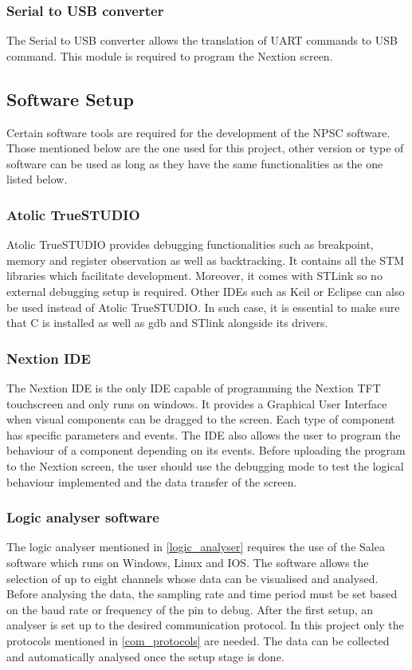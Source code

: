 \subsubsection{Serial to USB converter}
The Serial to USB converter allows the translation of UART commands to USB command. This module is required to program the Nextion screen.
 
\subsection{Software Setup}\label{software_setup}
Certain software tools are required for the development of the NPSC software. Those mentioned below are the one used for this project, other version or type of software can be used as long as they have the same functionalities as the one listed below.
\subsubsection{Atolic TrueSTUDIO}
Atolic TrueSTUDIO provides debugging functionalities such as breakpoint, memory and register observation as well as backtracking. It contains all the STM libraries which facilitate development. Moreover, it comes with STLink so no external debugging setup is required. Other IDEs such as Keil or Eclipse can also be used instead of Atolic TrueSTUDIO. In such case, it is essential to make sure that C is installed as well as gdb and STlink alongside its drivers. 
\subsubsection{Nextion IDE}
The Nextion IDE is the only IDE capable of programming the Nextion TFT touchscreen and only runs on windows. It provides a Graphical User Interface when visual components can be dragged to the screen. Each type of component has specific parameters and events. The IDE also allows the user to program the behaviour of a component depending on its events. Before uploading the program to the Nextion screen, the user should use the debugging mode to test the logical behaviour implemented and the data transfer of the screen.    
\subsubsection{Logic analyser software}
The logic analyser mentioned in \cref{logic_analyser} requires the use of the Salea software which runs on Windows, Linux and IOS. The software allows the selection of up to eight channels whose data can be visualised and analysed. Before analysing the data, the sampling rate and time period must be set based on the baud rate or frequency of the pin to debug. After the first setup, an analyser is set up to the desired communication protocol. In this project only the protocols mentioned in \cref{com_protocols} are needed. The data can be collected and automatically analysed once the setup stage is done.
